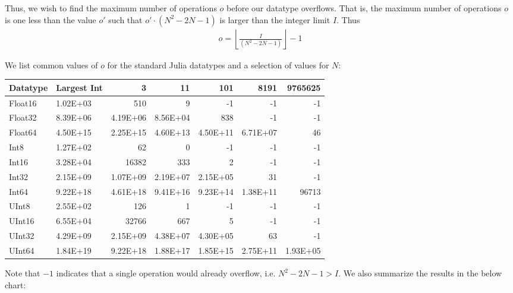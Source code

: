 Thus, we wish to find the maximum number of operations $o$ before our datatype overflows. That is, the maximum number of operations $o$ is one less than the value $o'$ such that $o' \cdot (N^2 - 2N - 1)$ is larger than the integer limit $I$. Thus
\begin{align*}
    o = \left\lfloor \frac{I}{(N^2 - 2N - 1)} \right\rfloor - 1
\end{align*}

We list common values of $o$ for the standard Julia datatypes and a selection of values for $N$:

\begin{center}
\begin{tabular}{llrrrrr}
\hline
\textbf{Datatype} & \multicolumn{1}{l}{\textbf{Largest Int}} & \textbf{3} & \textbf{11} & \textbf{101} & \textbf{8191} & \textbf{9765625} \\ \hline
Float16           & 1.02E+03                                     & 510        & 9           & -1           & -1            & -1               \\
Float32           & 8.39E+06                                     & 4.19E+06   & 8.56E+04    & 838          & -1            & -1               \\
Float64           & 4.50E+15                                     & 2.25E+15   & 4.60E+13    & 4.50E+11     & 6.71E+07      & 46               \\
Int8              & 1.27E+02                                     & 62         & 0           & -1           & -1            & -1               \\
Int16             & 3.28E+04                                     & 16382      & 333         & 2            & -1            & -1               \\
Int32             & 2.15E+09                                     & 1.07E+09   & 2.19E+07    & 2.15E+05     & 31            & -1               \\
Int64             & 9.22E+18                                     & 4.61E+18   & 9.41E+16    & 9.23E+14     & 1.38E+11      & 96713            \\
UInt8             & 2.55E+02                                     & 126        & 1           & -1           & -1            & -1               \\
UInt16            & 6.55E+04                                     & 32766      & 667         & 5            & -1            & -1               \\
UInt32            & 4.29E+09                                     & 2.15E+09   & 4.38E+07    & 4.30E+05     & 63            & -1               \\
UInt64            & 1.84E+19                                     & 9.22E+18   & 1.88E+17    & 1.85E+15     & 2.75E+11      & 1.93E+05         \\ \hline
\end{tabular}
\end{center}
%
Note that $-1$ indicates that a single operation would already overflow, i.e. $N^2 - 2N - 1 > I$. We also summarize the results in the below chart:

